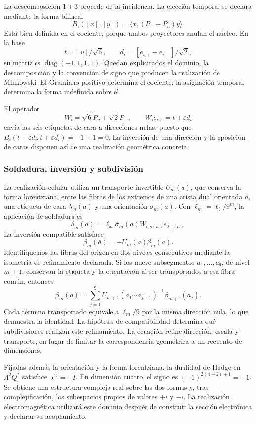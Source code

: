 La descomposición \(1+3\) procede de la incidencia. La elección temporal
se declara mediante la forma bilineal
\[
 B_\square([x],[y])=\langle x,(P_--P_u)y\rangle.
\]
Está bien definida en el cociente, porque ambos proyectores anulan el
núcleo. En la base
\[
 t=[u]/\sqrt6,\qquad
 d_i=[e_{i,+}-e_{i,-}]/\sqrt2,
\]
su matriz es \(\operatorname{diag}(-1,1,1,1)\). Quedan explicitados
el dominio, la descomposición y la convención de signo que producen
la realización de Minkowski. El Gramiano positivo determina el cociente;
la asignación temporal determina la forma indefinida sobre él.

El operador
\[
 W_\square=\sqrt6P_u+\sqrt2P_-,\qquad
 W_\square e_{i,\varepsilon}=t+\varepsilon d_i
\]
envía las seis etiquetas de cara a direcciones nulas, puesto que
\(B_\square(t+\varepsilon d_i,t+\varepsilon d_i)=-1+1=0\).
La inversión de una dirección y la oposición de caras disponen así
de una realización geométrica concreta.

\subsubsection{Soldadura, inversión y subdivisión}

La realización celular utiliza un transporte invertible \(U_m(a)\),
que conserva la forma lorentziana, entre las fibras de los extremos de
una arista dual orientada \(a\), una etiqueta
de cara \(\lambda_m(a)\) y una orientación \(\sigma_m(a)\).
Con \(\ell_m=\ell_0/9^m\), la aplicación de soldadura es
\[
 \beta_m(a)=\ell_m\sigma_m(a)
 W_{\square,s(a)}e_{\lambda_m(a)}.
\]
La inversión compatible satisface
\[
 \beta_m(\bar a)=-U_m(a)\beta_m(a).
\]
Identifiquemos las fibras del origen en dos niveles consecutivos mediante
la isometría de refinamiento declarada. Si los nueve subsegmentos
\(a_1,\ldots,a_9\), de nivel \(m+1\), conservan la etiqueta
y la orientación al ser transportados a esa fibra común, entonces
\begin{equation}
 \beta_m(a)=\sum_{j=1}^9
 U_{m+1}(a_1\cdots a_{j-1})^{-1}\beta_{m+1}(a_j).
 \label{x_reciprocidad:eq:soldadura-refinamiento}
\end{equation}
Cada término transportado equivale a \(\ell_m/9\) por la misma
dirección nula, lo que demuestra la identidad. La hipótesis de
compatibilidad determina qué subdivisiones realizan este refinamiento.
La ecuación reúne dirección, escala y transporte, en lugar de limitar
la correspondencia geométrica a un recuento de dimensiones.

Fijadas además la orientación y la forma lorentziana, la dualidad de
Hodge en \(\Lambda^2Q_\square^*\) satisface \(\star^2=-I\).
En dimensión cuatro, el signo es \((-1)^{2(4-2)+1}=-1\).
Se obtiene una estructura compleja real sobre las dos-formas y,
tras complejificación, los subespacios propios de valores \(+i\) y
\(-i\). La realización electromagnética utilizará este dominio
después de construir la sección electrónica y declarar su acoplamiento.

